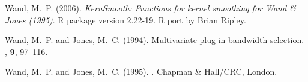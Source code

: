 \documentclass[a4paper,11pt]{article}
\begin{document}
\begin{thebibliography}{xx}
Wand, M.~P. (2006).
\newblock \emph{KernSmooth: Functions for kernel smoothing for Wand \& Jones
  (1995)}.
\newblock R package version 2.22-19. R port by Brian Ripley.

Wand, M.~P. and Jones, M.~C. (1994).
\newblock Multivariate plug-in bandwidth selection.
, \textbf{9}, 97--116.

Wand, M.~P. and Jones, M.~C. (1995).
.
\newblock Chapman \& Hall/CRC, London.

\end{thebibliography}
\end{document}
